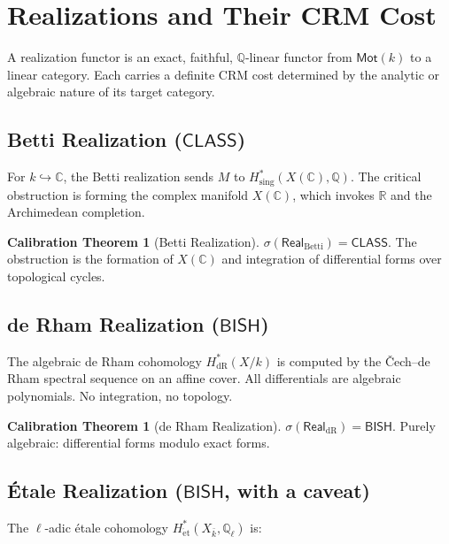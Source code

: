 \documentclass[11pt,a4paper]{article}
\theoremstyle{plain}
\theoremstyle{definition}
\newtheorem{calibration}[theorem]{Calibration Theorem}
\newcommand{\BISH}{\textsf{BISH}}
\newcommand{\CLASS}{\textsf{CLASS}}
\newcommand{\Mot}{\mathsf{Mot}}
\newcommand{\Real}{\mathsf{Real}}
\newcommand{\sig}{\sigma}
\newcommand{\Q}{\mathbb{Q}}
\newcommand{\R}{\mathbb{R}}
\newcommand{\C}{\mathbb{C}}
\begin{document}
\section{Realizations and Their CRM Cost}\label{sec:realizations}

A realization functor is an exact, faithful, $\Q$-linear functor from $\Mot(k)$ to a linear category. Each carries a definite CRM cost determined by the analytic or algebraic nature of its target category.

\subsection{Betti Realization ($\CLASS$)}

For $k \hookrightarrow \C$, the Betti realization sends $M$ to $H^*_{\mathrm{sing}}(X(\C), \Q)$. The critical obstruction is forming the complex manifold $X(\C)$, which invokes $\R$ and the Archimedean completion. 

\begin{calibration}[Betti Realization]\label{cal:betti}
$\sig(\Real_{\mathrm{Betti}}) = \CLASS$. The obstruction is the formation of $X(\C)$ and integration of differential forms over topological cycles.
\end{calibration}

\subsection{de Rham Realization ($\BISH$)}

The algebraic de Rham cohomology $H^*_{\mathrm{dR}}(X/k)$ is computed by the \v{C}ech--de Rham spectral sequence on an affine cover. All differentials are algebraic polynomials. No integration, no topology.

\begin{calibration}[de Rham Realization]\label{cal:derham}
$\sig(\Real_{\mathrm{dR}}) = \BISH$. Purely algebraic: differential forms modulo exact forms.
\end{calibration}

\subsection{\'Etale Realization ($\BISH$, with a caveat)}\label{sec:etale}

The $\ell$-adic \'etale cohomology $H^*_{\mathrm{\acute{e}t}}(X_{\bar{k}}, \Q_\ell)$ is:
\end{document}
